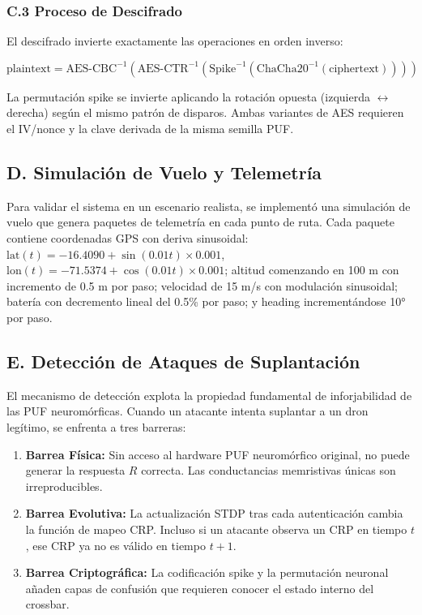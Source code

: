 \subsubsection*{C.3 Proceso de Descifrado}

El descifrado invierte exactamente las operaciones en orden inverso:

\begin{equation}
    \text{plaintext} = \text{AES-CBC}^{-1}\left( \text{AES-CTR}^{-1}\left( \text{Spike}^{-1}\left( \text{ChaCha20}^{-1}(\text{ciphertext}) \right) \right) \right)
    \label{eq:decrypt_order}
\end{equation}

La permutación spike se invierte aplicando la rotación opuesta (izquierda $\leftrightarrow$ derecha) según el mismo patrón de disparos. Ambas variantes de AES requieren el IV/nonce y la clave derivada de la misma semilla PUF.

\subsection*{D. Simulación de Vuelo y Telemetría}

Para validar el sistema en un escenario realista, se implementó una simulación de vuelo que genera paquetes de telemetría en cada punto de ruta. Cada paquete contiene coordenadas GPS con deriva sinusoidal: $\text{lat}(t) = -16.4090 + \sin(0.01t) \times 0.001$, $\text{lon}(t) = -71.5374 + \cos(0.01t) \times 0.001$; altitud comenzando en 100 m con incremento de 0.5 m por paso; velocidad de 15 m/s con modulación sinusoidal; batería con decremento lineal del 0.5\% por paso; y heading incrementándose 10° por paso.

\subsection*{E. Detección de Ataques de Suplantación}

El mecanismo de detección explota la propiedad fundamental de inforjabilidad de las PUF neuromórficas. Cuando un atacante intenta suplantar a un dron legítimo, se enfrenta a tres barreras:

\begin{enumerate}
    \item \textbf{Barrea Física:} Sin acceso al hardware PUF neuromórfico original, no puede generar la respuesta $R$ correcta. Las conductancias memristivas únicas son irreproducibles.
    \item \textbf{Barrea Evolutiva:} La actualización STDP tras cada autenticación cambia la función de mapeo CRP. Incluso si un atacante observa un CRP en tiempo $t$, ese CRP ya no es válido en tiempo $t+1$.
    \item \textbf{Barrea Criptográfica:} La codificación spike y la permutación neuronal añaden capas de confusión que requieren conocer el estado interno del crossbar.
\end{enumerate}

